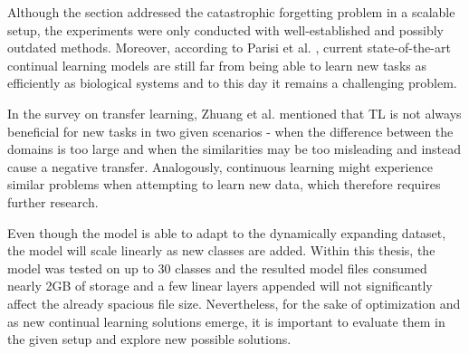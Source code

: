 Although the  section addressed the catastrophic forgetting problem in a scalable setup, the experiments were only conducted with well-established and possibly outdated methods. Moreover, according to Parisi et al. \cite{Parisi2018}, current state-of-the-art continual learning models are still far from being able to learn new tasks as efficiently as biological systems and to this day it remains a challenging problem. 

In the survey on transfer learning, Zhuang et al. \cite{Zhuang2019} mentioned that TL is not always beneficial for new tasks in two given scenarios - when the difference between the domains is too large and when the similarities may be too misleading and instead cause a negative transfer. Analogously, continuous learning might experience similar problems when attempting to learn new data, which therefore requires further research.  

Even though the model is able to adapt to the dynamically expanding dataset, the model will scale linearly as new classes are added. Within this thesis, the model was tested on up to 30 classes and the resulted model files consumed nearly 2GB of storage and a few linear layers appended will not significantly affect the already spacious file size. Nevertheless, for the sake of optimization and as new continual learning solutions emerge, it is important to evaluate them in the given setup and explore new possible solutions. 


\clearpage
